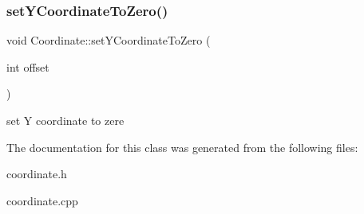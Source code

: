\subsubsection{\texorpdfstring{set\+Y\+Coordinate\+To\+Zero()}{setYCoordinateToZero()}}
{\footnotesize\ttfamily void Coordinate\+::set\+Y\+Coordinate\+To\+Zero (\begin{DoxyParamCaption}\item[{int}]{offset }\end{DoxyParamCaption})}

set Y coordinate to zere 

The documentation for this class was generated from the following files\+:\begin{DoxyCompactItemize}
\item 
coordinate.\+h\item 
coordinate.\+cpp\end{DoxyCompactItemize}
